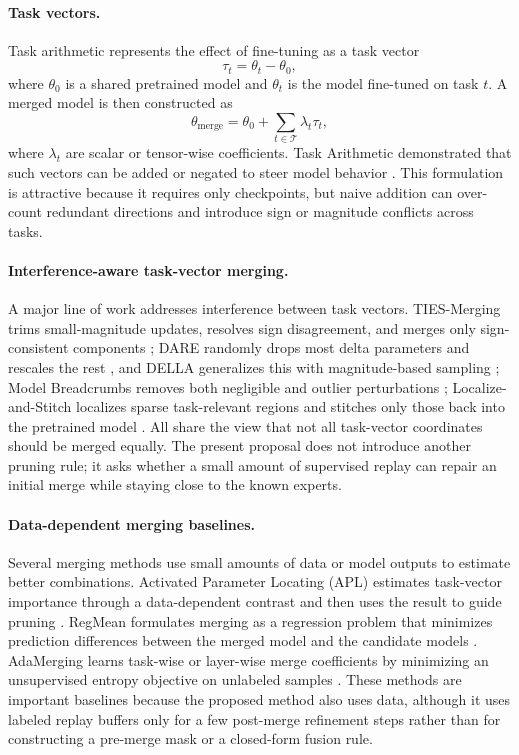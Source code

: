 \documentclass[11pt]{article}
\newcommand{\thetab}{\theta_0}
\newcommand{\taskvec}{\tau}
\newcommand{\tasks}{\mathcal{T}}
\begin{document}
\paragraph{Task vectors.}
Task arithmetic represents the effect of fine-tuning as a task vector
\begin{equation}
    \taskvec_t = \theta_t - \thetab,
\end{equation}
where $\thetab$ is a shared pretrained model and $\theta_t$ is the model fine-tuned on task $t$. A merged model is then constructed as
\begin{equation}
    \theta_{\mathrm{merge}} = \thetab + \sum_{t \in \tasks} \lambda_t \taskvec_t,
\end{equation}
where $\lambda_t$ are scalar or tensor-wise coefficients. Task Arithmetic demonstrated that such vectors can be added or negated to steer model behavior \citep{ilharco2022taskarithmetic}. This formulation is attractive because it requires only checkpoints, but naive addition can over-count redundant directions and introduce sign or magnitude conflicts across tasks.

\paragraph{Interference-aware task-vector merging.}
A major line of work addresses interference between task vectors. TIES-Merging trims small-magnitude updates, resolves sign disagreement, and merges only sign-consistent components \citep{yadav2023ties}; DARE randomly drops most delta parameters and rescales the rest \citep{yu2023dare}, and DELLA generalizes this with magnitude-based sampling \citep{deep2024della}; Model Breadcrumbs removes both negligible and outlier perturbations \citep{davari2023breadcrumbs}; Localize-and-Stitch localizes sparse task-relevant regions and stitches only those back into the pretrained model \citep{he2024localize}. All share the view that not all task-vector coordinates should be merged equally. The present proposal does not introduce another pruning rule; it asks whether a small amount of supervised replay can repair an initial merge while staying close to the known experts.

\paragraph{Data-dependent merging baselines.}
Several merging methods use small amounts of data or model outputs to estimate better combinations. Activated Parameter Locating (APL) estimates task-vector importance through a data-dependent contrast and then uses the result to guide pruning \citep{kong2024apl}. RegMean formulates merging as a regression problem that minimizes prediction differences between the merged model and the candidate models \citep{jin2023regmean}. AdaMerging learns task-wise or layer-wise merge coefficients by minimizing an unsupervised entropy objective on unlabeled samples \citep{yang2024adamerging}. These methods are important baselines because the proposed method also uses data, although it uses labeled replay buffers only for a few post-merge refinement steps rather than for constructing a pre-merge mask or a closed-form fusion rule.
\end{document}
